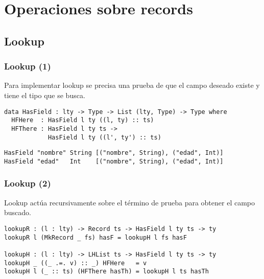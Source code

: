 \documentclass{beamer}
\begin{document}
\section{Operaciones sobre records}

\subsection{Lookup}

\begin{frame}[fragile]
\frametitle{Lookup (1)}

Para implementar lookup se precisa una prueba de que el campo deseado existe y tiene el tipo que se busca.

\pause

\begin{definition}
\begin{verbatim}
data HasField : lty -> Type -> List (lty, Type) -> Type where
  HFHere  : HasField l ty ((l, ty) :: ts)
  HFThere : HasField l ty ts -> 
            HasField l ty ((l', ty') :: ts)
\end{verbatim}
\end{definition}

\pause

\begin{example}
\begin{verbatim}
HasField "nombre" String [("nombre", String), ("edad", Int)]
HasField "edad"   Int    [("nombre", String), ("edad", Int)]
\end{verbatim}
\end{example}

\end{frame}

\begin{frame}[fragile]
\frametitle{Lookup (2)}

Lookup actúa recursivamente sobre el término de prueba para obtener el campo buscado.

\begin{definition}
\begin{verbatim}
lookupR : (l : lty) -> Record ts -> HasField l ty ts -> ty
lookupR l (MkRecord _ fs) hasF = lookupH l fs hasF

lookupH : (l : lty) -> LHList ts -> HasField l ty ts -> ty
lookupH _ ((_ .=. v) :: _) HFHere   = v
lookupH l (_ :: ts) (HFThere hasTh) = lookupH l ts hasTh
\end{verbatim}
\end{definition}

\end{frame}
\end{document}
